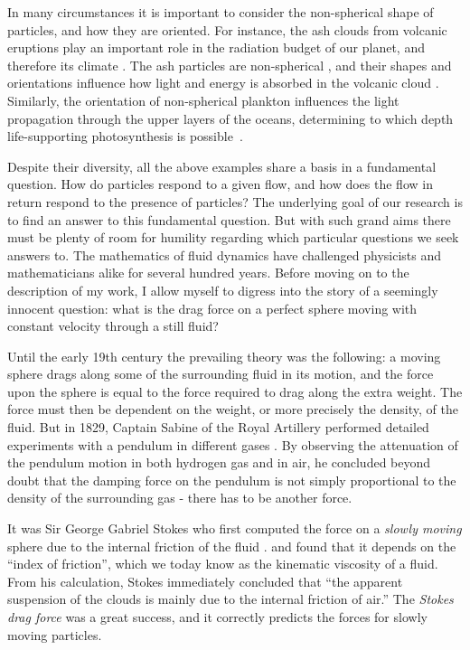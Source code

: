 \documentclass[thesis.tex]{subfiles}
\begin{document}
In many circumstances it is important to consider the non-spherical shape of particles, and how they are oriented. For instance, the ash clouds from volcanic eruptions play an important role in the radiation budget of our planet, and therefore its climate \cite{mather2003}. The ash particles are non-spherical \cite{gasteiger2011}, and their shapes and orientations influence how light and energy is absorbed in the volcanic cloud \cite{dubovik2002}. Similarly, the orientation of non-spherical plankton influences the light propagation through the upper layers of the oceans, determining to which depth life-supporting photosynthesis is possible~\cite{marcos2011}. 

Despite their diversity, all the above examples share a basis in a fundamental question. How do particles respond to a given flow, and how does the flow in return respond to the presence of particles? The underlying goal of our research is to find an answer to this fundamental question. But with such grand aims there must be plenty of room for humility regarding which particular questions we seek answers to. The mathematics of fluid dynamics have challenged physicists and mathematicians alike for several hundred years. Before moving on to the description of my work, I allow myself to digress into the story of a seemingly innocent question: what is the drag force on a perfect sphere moving with constant velocity through a still fluid?

Until the early 19th century the prevailing theory was the following: a moving sphere drags along some of the surrounding fluid in its motion, and the force upon the sphere is equal to the force required to drag along the extra weight. The force must then be dependent on the weight, or more precisely the density, of the fluid. But in 1829, Captain Sabine of the Royal Artillery performed detailed experiments with a pendulum in different gases \cite{sabine1829}. By observing the attenuation of the pendulum motion in both hydrogen gas and in air, he concluded beyond doubt that the damping force on the pendulum is not simply proportional to the density of the surrounding gas - there has to be another force.

It was Sir George Gabriel Stokes who first computed the force on a \emph{slowly moving
} sphere due to the internal friction of the fluid \cite{stokes1851}. and found that it depends on the ``index of friction'', which we today know as the kinematic viscosity of a fluid. From his calculation, Stokes immediately concluded that ``the apparent suspension of the clouds is mainly due to the internal friction of air.'' 
The \emph{Stokes drag force} was a great success, and it correctly predicts the forces for slowly moving particles.
\end{document}
